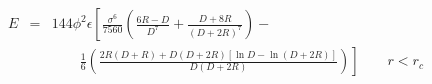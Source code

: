 


\begin{eqnarray}
E &=& 144 \phi^2 \epsilon \left[ \frac{\sigma^{6}}{7560} 
  \left(\frac{6R-D}{D^{7}} + \frac{D+8R}{(D+2R)^{7}} \right) - 
  \frac{}{} \right. \nonumber \\
  &&\qquad \left. \frac{1}{6} \left(\frac{2R(D+R) + D(D+2R)
    \left[ \ln D - \ln (D+2R) \right]}{D(D+2R)} \right) \right] 
\qquad r < r_c \nonumber
\end{eqnarray}


